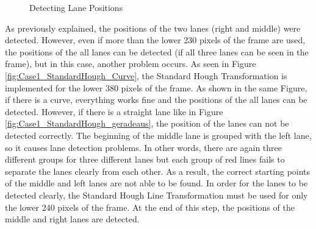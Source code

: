 \begin{figure}[H]
  \centering
  \hfill
  \caption{Detecting Lane Positions}
\end{figure}


As previously explained, the positions of the two lanes (right and middle) were detected. However, even if more than the lower 230 pixels of the frame are used, the positions of the all lanes can be detected (if all three lanes can be seen in the frame), but in this case, another problem occurs. As seen in Figure \ref{fig:Case1_StandardHough_Curve}, the Standard Hough Transformation is implemented for the lower 380 pixels of the frame. As shown in the same Figure, if there is a curve, everything works fine and the positions of the all lanes can be detected. However, if there is a straight lane like in Figure \ref{fig:Case1_StandardHough_geradeaus}, the position of the lanes can not be detected correctly.  The beginning of the middle lane is grouped with the left lane, so it causes lane detection problems. In other words, there are again three different groups for three different lanes but each group of red lines fails to separate the lanes clearly from each other. As a result, the correct starting points of the middle and left lanes are not able to be found. In order for the lanes to be detected clearly, the Standard Hough Line Transformation must be used for only the lower 240 pixels of the frame. At the end of this step, the positions of the middle and right lanes are detected.




